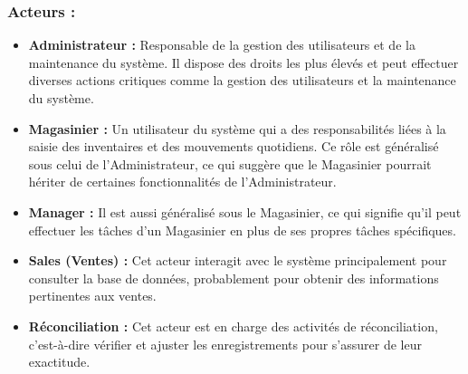 \documentclass[a4paper, oneside, 12pt, final]{extreport}
\begin{document}
\subsubsection{Acteurs :}
\begin{itemize}
\item \textbf{Administrateur :} Responsable de la gestion des utilisateurs et de la maintenance du système. Il dispose des droits les plus élevés et peut effectuer diverses actions critiques comme la gestion des utilisateurs et la maintenance du système.

\item \textbf{Magasinier :} Un utilisateur du système qui a des responsabilités liées à la saisie des inventaires et des mouvements quotidiens. Ce rôle est généralisé sous celui de l'Administrateur, ce qui suggère que le Magasinier pourrait hériter de certaines fonctionnalités de l'Administrateur.
\item \textbf{Manager :} Il est aussi généralisé sous le Magasinier, ce qui signifie qu'il peut effectuer les tâches d'un Magasinier en plus de ses propres tâches spécifiques.
\item \textbf{Sales (Ventes) :} Cet acteur interagit avec le système principalement pour consulter la base de données, probablement pour obtenir des informations pertinentes aux ventes.
\item \textbf{Réconciliation :} Cet acteur est en charge des activités de réconciliation, c’est-à-dire vérifier et ajuster les enregistrements pour s'assurer de leur exactitude.
\end{itemize}
\end{document}
